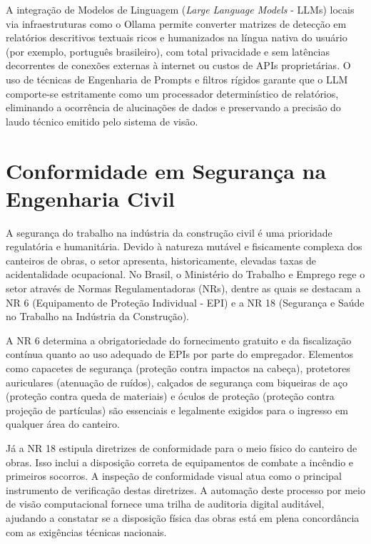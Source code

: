 A integração de Modelos de Linguagem (\textit{Large Language Models} - LLMs) locais via infraestruturas como o Ollama permite converter matrizes de detecção em relatórios descritivos textuais ricos e humanizados na língua nativa do usuário (por exemplo, português brasileiro), com total privacidade e sem latências decorrentes de conexões externas à internet ou custos de APIs proprietárias. O uso de técnicas de Engenharia de Prompts e filtros rígidos garante que o LLM comporte-se estritamente como um processador determinístico de relatórios, eliminando a ocorrência de alucinações de dados e preservando a precisão do laudo técnico emitido pelo sistema de visão.

\section{Conformidade em Segurança na Engenharia Civil}
A segurança do trabalho na indústria da construção civil é uma prioridade regulatória e humanitária. Devido à natureza mutável e fisicamente complexa dos canteiros de obras, o setor apresenta, historicamente, elevadas taxas de acidentalidade ocupacional. No Brasil, o Ministério do Trabalho e Emprego rege o setor através de Normas Regulamentadoras (NRs), dentre as quais se destacam a NR 6 \cite{brasil_nr6} (Equipamento de Proteção Individual - EPI) e a NR 18 \cite{brasil_nr18} (Segurança e Saúde no Trabalho na Indústria da Construção).

A NR 6 determina a obrigatoriedade do fornecimento gratuito e da fiscalização contínua quanto ao uso adequado de EPIs por parte do empregador. Elementos como capacetes de segurança (proteção contra impactos na cabeça), protetores auriculares (atenuação de ruídos), calçados de segurança com biqueiras de aço (proteção contra queda de materiais) e óculos de proteção (proteção contra projeção de partículas) são essenciais e legalmente exigidos para o ingresso em qualquer área do canteiro.

Já a NR 18 estipula diretrizes de conformidade para o meio físico do canteiro de obras. Isso inclui a disposição correta de equipamentos de combate a incêndio e primeiros socorros. A inspeção de conformidade visual atua como o principal instrumento de verificação destas diretrizes. A automação deste processo por meio de visão computacional fornece uma trilha de auditoria digital auditável, ajudando a constatar se a disposição física das obras está em plena concordância com as exigências técnicas nacionais.

